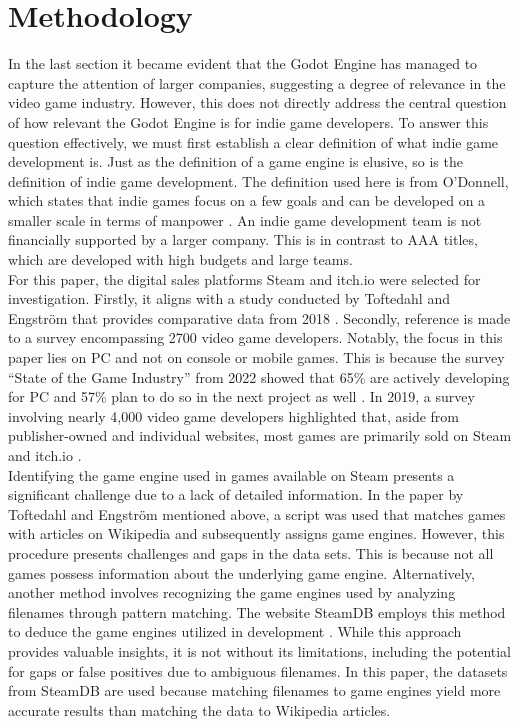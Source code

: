 \section{Methodology}
In the last section it became evident that the Godot Engine has managed to capture the attention of larger companies, suggesting a degree of relevance in the video game industry.
However, this does not directly address the central question of how relevant the Godot Engine is for indie game developers.
To answer this question effectively, we must first establish a clear definition of what indie game development is.
Just as the definition of a game engine is elusive, so is the definition of indie game development.
The definition used here is from O'Donnell, which states that indie games focus on a few goals and can be developed on a smaller scale in terms of manpower \cite{indie-definition}.
An indie game development team is not financially supported by a larger company.
This is in contrast to AAA titles, which are developed with high budgets and large teams.\\

For this paper, the digital sales platforms Steam and itch.io were selected for investigation.
Firstly, it aligns with a study conducted by Toftedahl and Engström that provides comparative data from 2018 \cite{game-engine-taxonomy}.
Secondly, reference is made to a survey encompassing 2700 video game developers.
Notably, the focus in this paper lies on PC and not on console or mobile games.
This is because the survey ``State of the Game Industry'' from 2022 showed that 65\% are actively developing for PC and 57\% plan to do so in the next project as well \cite{gdc-2023}.
In 2019, a survey involving nearly 4,000 video game developers highlighted that, aside from publisher-owned and individual websites, most games are primarily sold on Steam and itch.io \cite{gdc-2019}.\\

Identifying the game engine used in games available on Steam presents a significant challenge due to a lack of detailed information.
In the paper by Toftedahl and Engström mentioned above, a script was used that matches games with articles on Wikipedia and subsequently assigns game engines.
However, this procedure presents challenges and gaps in the data sets.
This is because not all games possess information about the underlying game engine.
Alternatively, another method involves recognizing the game engines used by analyzing filenames through pattern matching.
The website SteamDB employs this method to deduce the game engines utilized in development \cite{steamdb-tech}.
While this approach provides valuable insights, it is not without its limitations, including the potential for gaps or false positives due to ambiguous filenames.
In this paper, the datasets from SteamDB are used because matching filenames to game engines yield more accurate results than matching the data to Wikipedia articles. \\

